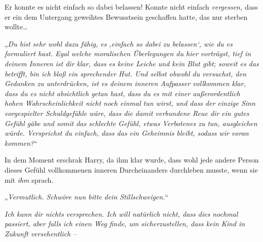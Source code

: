 Er konnte es nicht einfach so dabei belassen! Konnte nicht einfach \emph{vergessen,} dass er ein dem Untergang geweihtes Bewusstsein geschaffen hatte, das nur sterben wollte…

„\emph{Du bist sehr wohl dazu fähig, es ‚einfach so dabei zu belassen‘, wie du es formuliert hast. Egal welche moralischen Überlegungen du hier vorträgst, tief in deinem Inneren ist dir klar, dass es keine Leiche und kein Blut gibt; soweit es das betrifft, bin ich bloß ein sprechender Hut. Und selbst obwohl du versuchst, den Gedanken zu unterdrücken, ist es deinem inneren Aufpasser vollkommen klar, dass du es nicht absichtlich getan hast, dass du es mit einer außerordentlich hohen Wahrscheinlichkeit nicht noch einmal tun wirst, und dass der einzige Sinn vorgespielter Schuldgefühle wäre, dass die damit verbundene Reue dir ein gutes Gefühl gäbe und somit das schlechte Gefühl, etwas Verbotenes zu tun, ausgleichen würde. Versprichst du einfach, dass das ein Geheimnis bleibt, sodass wir voran kommen?}“

In dem Moment erschrak Harry, da ihm klar wurde, dass wohl jede andere Person dieses Gefühl vollkommenen inneren Durcheinanders durchleben musste, wenn sie mit \emph{ihm} sprach.

„\emph{Vermutlich. Schwöre nun bitte dein Stillschweigen.}“

\emph{Ich kann dir nichts versprechen. Ich will natürlich nicht, dass dies nochmal passiert, aber falls ich einen Weg finde, um sicherzustellen, dass kein Kind in Zukunft versehentlich –}


